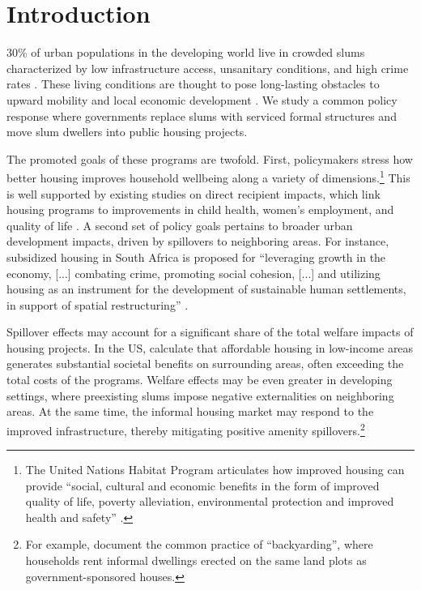 \documentclass[12pt]{article}
\begin{document}
\section{Introduction} \label{sec:introduction}


30\% of urban populations in the developing world live in crowded slums characterized by low infrastructure access, unsanitary conditions, and high crime rates \citep{mdg}. These living conditions are thought to pose long-lasting obstacles to upward mobility and local economic development \citep{marx2013slums}. We study a common policy response where governments replace slums with serviced formal structures and move slum dwellers into public housing projects. 

The promoted goals of these programs are twofold. First, policymakers stress how better housing improves household wellbeing along a variety of dimensions.\footnote{The United Nations Habitat Program articulates how improved housing can provide ``social, cultural and economic benefits in the form of improved quality of life, poverty alleviation, environmental protection and improved health and safety'' \citep{unhabitat}.} This is well supported by existing studies on direct recipient impacts, which link housing programs to improvements in child health, women's employment, and quality of life \citep{cattaneo2009housing,franklin2016enabled,galiani2017shelter}. A second set of policy goals pertains to broader urban development impacts, driven by spillovers to neighboring areas. For instance, subsidized housing in South Africa is proposed for ``leveraging growth in the economy, [...] combating crime, promoting social cohesion, [...] and utilizing housing as an instrument for the development of sustainable human settlements, in support of spatial restructuring'' \citep{bng}. 

Spillover effects may account for a significant share of the total welfare impacts of housing projects.  In the US, \cite{diamond2016wants} calculate that affordable housing in low-income areas generates substantial societal benefits on surrounding areas, often exceeding the total costs of the programs. Welfare effects may be even greater in developing settings, where preexisting slums impose negative externalities on neighboring areas. At the same time, the informal housing market may respond to the improved infrastructure, thereby mitigating positive amenity spillovers.\footnote{For example, \cite{Brueckner2018backyarding} document the common practice of ``backyarding'', where households rent informal dwellings erected on the same land plots as government-sponsored houses.} 
\end{document}
